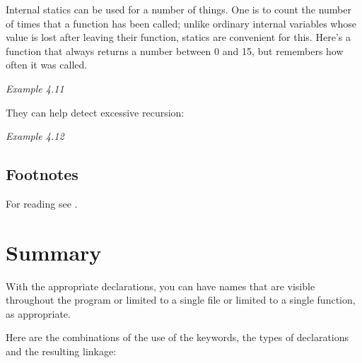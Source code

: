    Internal statics can be used for a number of things. One is to count
    the number of times that a function has been called; unlike ordinary
    internal variables whose value is lost after leaving their function,
    statics are convenient for this. Here's a function that always returns a
    number between 0 and 15, but remembers how often it was called.

    \begin{center}\textit{Example 4.11}\end{center}

   They can help detect excessive recursion:

   \begin{center}\textit{Example 4.12}\end{center}


  
 \subsection{Footnotes}%
    For reading see \cite{Stro}. 



        \section{Summary}
        

  With the appropriate declarations, you can have names that are visible
   throughout the program or limited to a single file or limited to a single
   function, as appropriate.


  Here are the combinations of the use of the keywords, the types of
   declarations and the resulting linkage:


